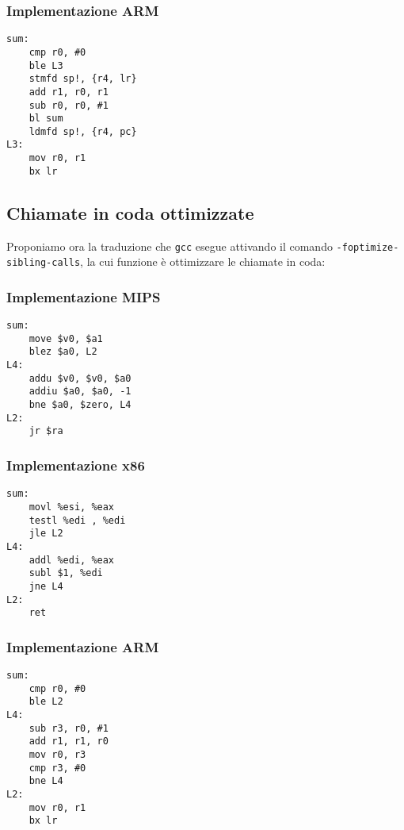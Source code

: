 \documentclass[class=book, crop=false, oneside]{standalone}
\begin{document}
\subsubsection{Implementazione ARM}

\begin{verbatim}
sum:
	cmp r0, #0
	ble L3
	stmfd sp!, {r4, lr}
	add r1, r0, r1
	sub r0, r0, #1
	bl sum
	ldmfd sp!, {r4, pc}
L3:
	mov r0, r1
	bx lr
\end{verbatim}

\subsection*{Chiamate in coda ottimizzate}
Proponiamo ora la traduzione che \texttt{gcc} esegue attivando il comando \texttt{-foptimize-sibling-calls}, la cui funzione è ottimizzare le chiamate in coda:
\subsubsection{Implementazione MIPS}

\begin{verbatim}
sum:
	move $v0, $a1
	blez $a0, L2
L4:
	addu $v0, $v0, $a0
	addiu $a0, $a0, -1
	bne $a0, $zero, L4
L2:
	jr $ra
\end{verbatim}

\subsubsection{Implementazione x86}

\begin{verbatim}
sum:
	movl %esi, %eax
	testl %edi , %edi
	jle L2
L4:
	addl %edi, %eax
	subl $1, %edi
	jne L4
L2:
	ret
\end{verbatim}

\subsubsection{Implementazione ARM}

\begin{verbatim}
sum:
	cmp r0, #0
	ble L2
L4:
	sub r3, r0, #1
	add r1, r1, r0
	mov r0, r3
	cmp r3, #0
	bne L4
L2:
	mov r0, r1
	bx lr
\end{verbatim}
\end{document}
